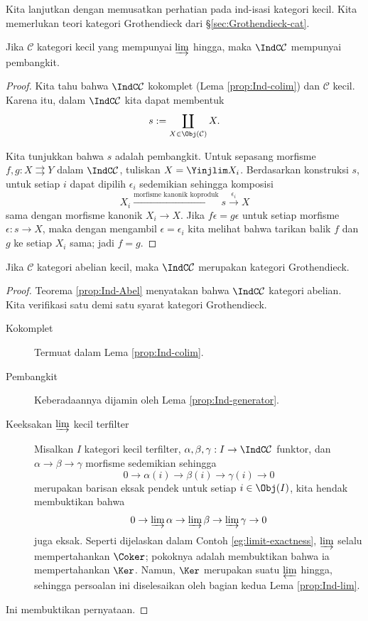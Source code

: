 Kita lanjutkan dengan memusatkan perhatian pada ind-isasi kategori kecil. Kita memerlukan teori kategori Grothendieck dari \S\ref{sec:Grothendieck-cat}.

\begin{lemma}\label{prop:Ind-generator}
	Jika $\mathcal{C}$ kategori kecil yang mempunyai $\varinjlim$ hingga, maka $\IndC\mathcal{C}$ mempunyai pembangkit.
\end{lemma}
\begin{proof}
	Kita tahu bahwa $\IndC\mathcal{C}$ kokomplet (Lema \ref{prop:Ind-colim}) dan $\mathcal{C}$ kecil. Karena itu, dalam $\IndC\mathcal{C}$ kita dapat membentuk
	\[ s := \coprod_{X \in \Obj(\mathcal{C})} X. \]
	
	Kita tunjukkan bahwa $s$ adalah pembangkit. Untuk sepasang morfisme $f,g:X\rightrightarrows Y$ dalam $\IndC\mathcal{C}$, tuliskan $X=\Yinjlim X_i$. Berdasarkan konstruksi $s$, untuk setiap $i$ dapat dipilih $\epsilon_i$ sedemikian sehingga komposisi
	\[ X_i \xrightarrow{\text{morfisme kanonik koproduk}} s \xrightarrow{\epsilon_i} X \]
	sama dengan morfisme kanonik $X_i\to X$. Jika $f\epsilon=g\epsilon$ untuk setiap morfisme $\epsilon:s\to X$, maka dengan mengambil $\epsilon=\epsilon_i$ kita melihat bahwa tarikan balik $f$ dan $g$ ke setiap $X_i$ sama; jadi $f=g$.
\end{proof}

\begin{theorem}\label{prop:Ind-Grothendieck}
	Jika $\mathcal{C}$ kategori abelian kecil, maka $\IndC\mathcal{C}$ merupakan kategori Grothendieck.
\end{theorem}
\begin{proof}
	Teorema \ref{prop:Ind-Abel} menyatakan bahwa $\IndC\mathcal{C}$ kategori abelian. Kita verifikasi satu demi satu syarat kategori Grothendieck.
	\begin{description}
		\item[Kokomplet] Termuat dalam Lema \ref{prop:Ind-colim}.
		\item[Pembangkit] Keberadaannya dijamin oleh Lema \ref{prop:Ind-generator}.
		\item[Keeksakan $\varinjlim$ kecil terfilter] Misalkan $I$ kategori kecil terfilter, $\alpha,\beta,\gamma:I\to\IndC\mathcal{C}$ funktor, dan $\alpha\to\beta\to\gamma$ morfisme sedemikian sehingga
		\[ 0 \to \alpha(i) \to \beta(i) \to \gamma(i) \to 0 \]
		merupakan barisan eksak pendek untuk setiap $i\in\Obj(I)$, kita hendak membuktikan bahwa
		\[ 0 \to \varinjlim \alpha \to \varinjlim \beta \to \varinjlim \gamma \to 0 \]
		juga eksak. Seperti dijelaskan dalam Contoh \ref{eg:limit-exactness}, $\varinjlim$ selalu mempertahankan $\Coker$; pokoknya adalah membuktikan bahwa ia mempertahankan $\Ker$. Namun, $\Ker$ merupakan suatu $\varprojlim$ hingga, sehingga persoalan ini diselesaikan oleh bagian kedua Lema \ref{prop:Ind-lim}.
	\end{description}
	Ini membuktikan pernyataan.
\end{proof}
